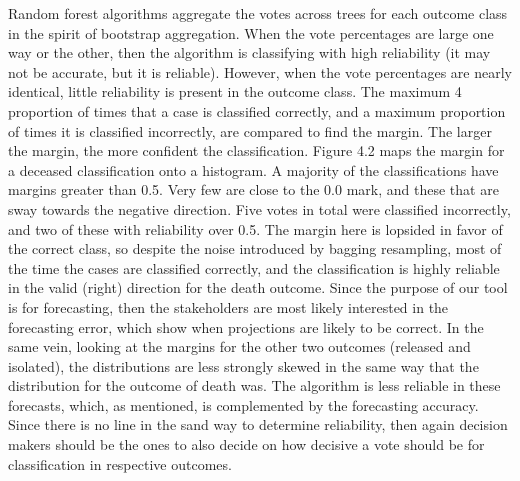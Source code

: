 \documentclass[
]{article}
\begin{document}
Random forest algorithms aggregate the votes across trees for each
outcome class in the spirit of bootstrap aggregation. When the vote
percentages are large one way or the other, then the algorithm is
classifying with high reliability (it may not be accurate, but it is
reliable). However, when the vote percentages are nearly identical,
little reliability is present in the outcome class. The maximum 4
proportion of times that a case is classified correctly, and a maximum
proportion of times it is classified incorrectly, are compared to find
the margin. The larger the margin, the more confident the
classification. Figure 4.2 maps the margin for a deceased classification
onto a histogram. A majority of the classifications have margins greater
than 0.5. Very few are close to the 0.0 mark, and these that are sway
towards the negative direction. Five votes in total were classified
incorrectly, and two of these with reliability over 0.5. The margin here
is lopsided in favor of the correct class, so despite the noise
introduced by bagging resampling, most of the time the cases are
classified correctly, and the classification is highly reliable in the
valid (right) direction for the death outcome. Since the purpose of our
tool is for forecasting, then the stakeholders are most likely
interested in the forecasting error, which show when projections are
likely to be correct. In the same vein, looking at the margins for the
other two outcomes (released and isolated), the distributions are less
strongly skewed in the same way that the distribution for the outcome of
death was. The algorithm is less reliable in these forecasts, which, as
mentioned, is complemented by the forecasting accuracy. Since there is
no line in the sand way to determine reliability, then again decision
makers should be the ones to also decide on how decisive a vote should
be for classification in respective outcomes.
\end{document}
